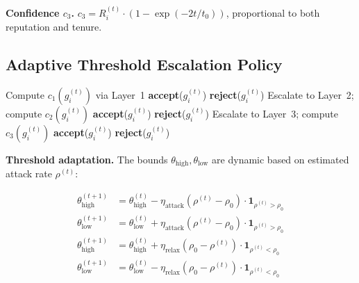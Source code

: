 \documentclass[10pt,journal]{IEEEtran}
\begin{document}
\textbf{Confidence $c_3$.} $c_3 = R_i^{(t)} \cdot (1 - \exp(-2t/t_0))$, proportional to both reputation and tenure.

\subsection{Adaptive Threshold Escalation Policy}
\label{sec:escalation}

\begin{algorithm}[t]
\caption{Gated cascade escalation policy.}
\label{alg:cascade}
\begin{algorithmic}[1]
  \State Compute $c_1(g_i^{(t)})$ via Layer~1
    \State \textbf{accept}($g_i^{(t)}$)
    \State \textbf{reject}($g_i^{(t)}$)
  \Else
    \State Escalate to Layer~2; compute $c_2(g_i^{(t)})$
      \State \textbf{accept}($g_i^{(t)}$)
      \State \textbf{reject}($g_i^{(t)}$)
    \Else
      \State Escalate to Layer~3; compute $c_3(g_i^{(t)})$
        \State \textbf{accept}($g_i^{(t)}$)
      \Else
        \State \textbf{reject}($g_i^{(t)}$)
      \EndIf
    \EndIf
  \EndIf
\EndFor
\end{algorithmic}
\end{algorithm}

\textbf{Threshold adaptation.} The bounds $\theta_{\text{high}}, \theta_{\text{low}}$ are dynamic based on estimated attack rate $\rho^{(t)}$:

\begin{align}
\theta_{\text{high}}^{(t+1)} &= \theta_{\text{high}}^{(t)} - \eta_{\text{attack}} (\rho^{(t)} - \rho_0) \cdot \mathbf{1}_{\rho^{(t)} > \rho_0} \label{eq:tau-high-attack}\\
\theta_{\text{low}}^{(t+1)}  &= \theta_{\text{low}}^{(t)}  + \eta_{\text{attack}} (\rho^{(t)} - \rho_0) \cdot \mathbf{1}_{\rho^{(t)} > \rho_0} \label{eq:tau-low-attack}\\
\theta_{\text{high}}^{(t+1)} &= \theta_{\text{high}}^{(t)} + \eta_{\text{relax}} (\rho_0 - \rho^{(t)}) \cdot \mathbf{1}_{\rho^{(t)} < \rho_0} \label{eq:tau-high-relax}\\
\theta_{\text{low}}^{(t+1)}  &= \theta_{\text{low}}^{(t)}  - \eta_{\text{relax}} (\rho_0 - \rho^{(t)}) \cdot \mathbf{1}_{\rho^{(t)} < \rho_0} \label{eq:tau-low-relax}
\end{align}
\end{document}
